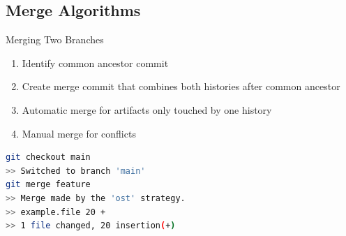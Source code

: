 \subsection{Merge Algorithms}
\begin{frame}[fragile]{\insertsubsection}
	\begin{definition}{Merging Two Branches}
		\begin{enumerate}
			\item Identify common ancestor commit
			\item Create merge commit that combines both histories after common ancestor
			\item Automatic merge for artifacts only touched by one history
			\item Manual merge for conflicts
		\end{enumerate}

	\end{definition}
	\begin{fancycolumns}[animation=none, widths={30}]
		\begin{lstlisting}[language=bash, basicstyle=\scriptsize, breaklines=true, numbers=none, escapechar=*]
git checkout main
>> Switched to branch 'main'
git merge feature
>> Merge made by the 'ost' strategy.
>> example.file 20 +
>> 1 file changed, 20 insertion(+)


\end{lstlisting}
\end{fancycolumns}
\end{frame}

